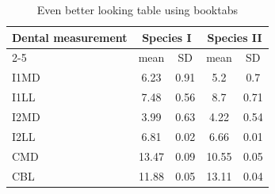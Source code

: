 \begin{table}
\caption{Even better looking table using booktabs}
\centering
\label{table:good_table}
\begin{tabular}{l c c c c}
\toprule
\multirow{2}{*}{Dental measurement} & \multicolumn{2}{c}{Species I} & \multicolumn{2}{c}{Species II} \\ 
\cmidrule{2-5}
  & mean & SD  & mean & SD  \\ 
\midrule
I1MD & 6.23 & 0.91 & 5.2  & 0.7  \\

I1LL & 7.48 & 0.56 & 8.7  & 0.71 \\

I2MD & 3.99 & 0.63 & 4.22 & 0.54 \\

I2LL & 6.81 & 0.02 & 6.66 & 0.01 \\

CMD & 13.47 & 0.09 & 10.55 & 0.05 \\

CBL & 11.88 & 0.05 & 13.11 & 0.04\\ 
\bottomrule
\end{tabular}
\end{table}
